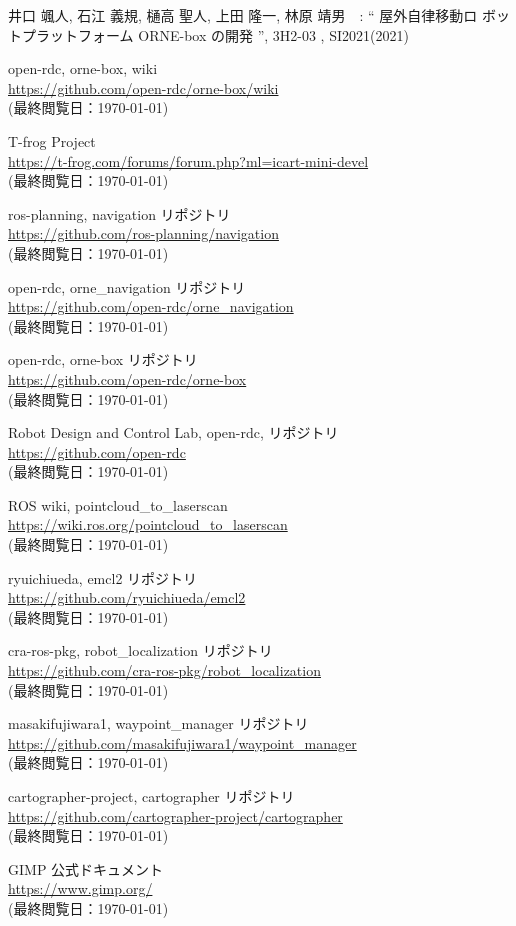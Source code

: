 \documentclass[twocolumn, 9pt]{jsproceedings}
\begin{document}
\footnotesize
\begin{thebibliography}{99}

井口 颯人, 石江 義規, 樋高 聖人, 上田 隆一, 林原 靖男　: “ 屋外自律移動ロ
ボットプラットフォーム ORNE-box の開発 ”, 3H2-03 , SI2021(2021)

open-rdc, orne-box, wiki\\
\url{https://github.com/open-rdc/orne-box/wiki}\\
(最終閲覧日：\today)

T-frog Project\\
\url{https://t-frog.com/forums/forum.php?ml=icart-mini-devel}\\
(最終閲覧日：\today)

ros-planning, navigation リポジトリ\\
\url{https://github.com/ros-planning/navigation}\\
(最終閲覧日：\today)

open-rdc, orne\_navigation リポジトリ\\
\url{https://github.com/open-rdc/orne_navigation}\\
(最終閲覧日：\today)

open-rdc, orne-box リポジトリ\\
\url{https://github.com/open-rdc/orne-box}\\
(最終閲覧日：\today)

Robot Design and Control Lab, open-rdc, リポジトリ\\
\url{https://github.com/open-rdc}\\
(最終閲覧日：\today)

ROS wiki, pointcloud\_to\_laserscan\\
\url{https://wiki.ros.org/pointcloud_to_laserscan}\\
(最終閲覧日：\today)

ryuichiueda, emcl2 リポジトリ\\
\url{https://github.com/ryuichiueda/emcl2}\\
(最終閲覧日：\today)

cra-ros-pkg, robot\_localization リポジトリ\\
\url{https://github.com/cra-ros-pkg/robot_localization}\\
(最終閲覧日：\today)

masakifujiwara1, waypoint\_manager リポジトリ\\
\url{https://github.com/masakifujiwara1/waypoint_manager}\\
(最終閲覧日：\today)

cartographer-project, cartographer リポジトリ\\
\url{https://github.com/cartographer-project/cartographer}\\
(最終閲覧日：\today)

GIMP 公式ドキュメント\\
\url{https://www.gimp.org/}\\
(最終閲覧日：\today)

\end{thebibliography}
\normalsize
\end{document}
